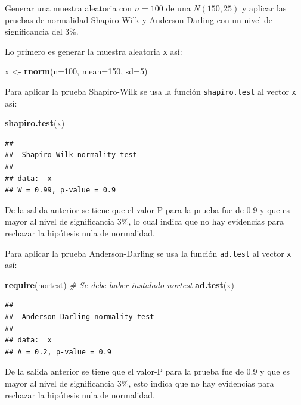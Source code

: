 \documentclass[10pt,]{krantz}
\makeatletter
\newenvironment{Shaded}{\begin{snugshade}}{\end{snugshade}}
\newcommand{\KeywordTok}[1]{\textcolor[rgb]{0.13,0.29,0.53}{\textbf{#1}}}
\newcommand{\DataTypeTok}[1]{\textcolor[rgb]{0.13,0.29,0.53}{#1}}
\newcommand{\DecValTok}[1]{\textcolor[rgb]{0.00,0.00,0.81}{#1}}
\newcommand{\StringTok}[1]{\textcolor[rgb]{0.31,0.60,0.02}{#1}}
\newcommand{\CommentTok}[1]{\textcolor[rgb]{0.56,0.35,0.01}{\textit{#1}}}
\newcommand{\NormalTok}[1]{#1}
\newenvironment{kframe}{%
\medskip{}
\setlength{\fboxsep}{.8em}
 \def\at@end@of@kframe{}%
 \ifinner\ifhmode%
  \def\at@end@of@kframe{\end{minipage}}%
  \begin{minipage}{\columnwidth}%
 \fi\fi%
 \def\FrameCommand##1{\hskip\@totalleftmargin \hskip-\fboxsep
 \colorbox{shadecolor}{##1}\hskip-\fboxsep
     \hskip-\linewidth \hskip-\@totalleftmargin \hskip\columnwidth}%
 \MakeFramed {\advance\hsize-\width
   \@totalleftmargin\z@ \linewidth\hsize
   \@setminipage}}%
 {\par\unskip\endMakeFramed%
 \at@end@of@kframe}
\renewenvironment{Shaded}{\begin{kframe}}{\end{kframe}}
\makeatother
\begin{document}
Generar una muestra aleatoria con \(n=100\) de una \(N(150, 25)\) y
aplicar las pruebas de normalidad Shapiro-Wilk y Anderson-Darling con un
nivel de significancia del 3\%.

Lo primero es generar la muestra aleatoria \texttt{x} así:

\begin{Shaded}
\begin{Highlighting}[]
\NormalTok{x <-}\StringTok{ }\KeywordTok{rnorm}\NormalTok{(}\DataTypeTok{n=}\DecValTok{100}\NormalTok{, }\DataTypeTok{mean=}\DecValTok{150}\NormalTok{, }\DataTypeTok{sd=}\DecValTok{5}\NormalTok{)}
\end{Highlighting}
\end{Shaded}

Para aplicar la prueba Shapiro-Wilk se usa la función
\texttt{shapiro.test} al vector \texttt{x} así:

\begin{Shaded}
\begin{Highlighting}[]
\KeywordTok{shapiro.test}\NormalTok{(x)}
\end{Highlighting}
\end{Shaded}

\begin{verbatim}
## 
##  Shapiro-Wilk normality test
## 
## data:  x
## W = 0.99, p-value = 0.9
\end{verbatim}

De la salida anterior se tiene que el valor-P para la prueba fue de 0.9
y que es mayor al nivel de significancia 3\%, lo cual indica que no hay
evidencias para rechazar la hipótesis nula de normalidad.

Para aplicar la prueba Anderson-Darling se usa la función
\texttt{ad.test} al vector \texttt{x} así:

\begin{Shaded}
\begin{Highlighting}[]
\KeywordTok{require}\NormalTok{(nortest)  }\CommentTok{# Se debe haber instalado nortest}
\KeywordTok{ad.test}\NormalTok{(x)}
\end{Highlighting}
\end{Shaded}

\begin{verbatim}
## 
##  Anderson-Darling normality test
## 
## data:  x
## A = 0.2, p-value = 0.9
\end{verbatim}

De la salida anterior se tiene que el valor-P para la prueba fue de 0.9
y que es mayor al nivel de significancia 3\%, esto indica que no hay
evidencias para rechazar la hipótesis nula de normalidad.
\end{document}
